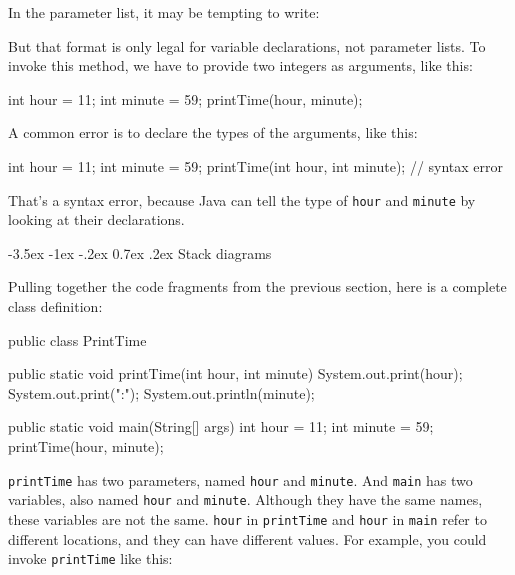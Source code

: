 \documentclass[12pt]{book}
\makeatletter
\theoremstyle{exercise}
\newcommand{\java}[1]{\verb"#1"}
\renewcommand{\section}{\@startsection{section}{1}{\z@}%
    {-3.5ex \@plus -1ex \@minus -.2ex}%
    {0.7ex \@plus.2ex}%
    {\normalfont\Large\bfseries}}
\newcommand{\java}[1]{\lstinline{#1}} %
\makeatother
\begin{document}
In the parameter list, it may be tempting to write:

\begin{code}
    public static void printTime(int hour, minute) {
        ...
\end{code}

But that format is only legal for variable declarations, not parameter lists.
To invoke this method, we have to provide two integers as arguments, like this:

\begin{code}
    int hour = 11;
    int minute = 59;
    printTime(hour, minute);
\end{code}

A common error is to declare the types of the arguments, like this:

\begin{code}
    int hour = 11;
    int minute = 59;
    printTime(int hour, int minute);  // syntax error
\end{code}

That's a syntax error, because Java can tell the type of \java{hour} and \java{minute} by looking at their declarations.



\section{Stack diagrams}
\label{stack}


Pulling together the code fragments from the previous section, here is a complete class definition:

\begin{code}
public class PrintTime {

    public static void printTime(int hour, int minute) {
        System.out.print(hour);
        System.out.print(":");
        System.out.println(minute);
    }

    public static void main(String[] args) {
        int hour = 11;
        int minute = 59;
        printTime(hour, minute);
    }
}
\end{code}

\java{printTime} has two parameters, named \java{hour} and \java{minute}.
And \java{main} has two variables, also named \java{hour} and \java{minute}.
Although they have the same names, these variables are not the same.
\java{hour} in \java{printTime} and \java{hour} in \java{main} refer to different locations, and they can have different values.
For example, you could invoke \java{printTime} like this:
\end{document}
